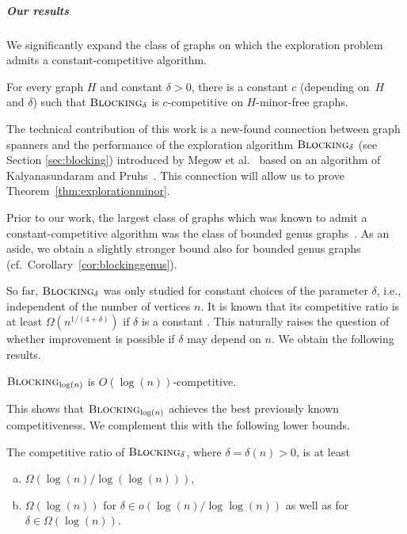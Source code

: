 \documentclass[a4paper,cleveref, autoref, thm-restate, thm-restate, UKenglish]{lipics-v2021}
\newcommand{\blocking}{\textsc{Blocking}}
\begin{document}
\subparagraph*{Our results} 

We significantly expand the class of graphs on which the exploration problem admits a constant-competitive algorithm.


\begin{theorem}\label{thm:explorationminor}
For every graph $H$ and constant $\delta>0$, there is a constant $c$ (depending on~$H$ and $\delta$) such that $\blocking_\delta$ is $c$-competitive on $H$-minor-free graphs.
\end{theorem}

The technical contribution of this work is a new-found connection between graph spanners and the performance of the exploration algorithm $\blocking_\delta$ (see Section \ref{sec:blocking}) introduced by Megow et al.~\cite{megow} based on an algorithm of Kalyanasundaram and Pruhs~\cite{pruhs94}. This connection will allow us to prove Theorem~\ref{thm:explorationminor}.

Prior to our work, the largest class of graphs which was known to admit a constant-competitive algorithm was the class of bounded genus graphs~\cite{megow}. 
As an aside, we obtain a slightly stronger bound also for bounded genus graphs (cf.~Corollary~\ref{cor:blockinggenus}).

So far, $\blocking_\delta$ was only studied for constant choices of the parameter $\delta$, i.e., independent of the number of vertices $n$. It is known that its competitive ratio is at least $\Omega (n^{1/(4+\delta )})$ if $\delta$ is a constant \cite{megow}. This naturally raises the question of whether improvement is possible if $\delta$ may depend on $n$. We obtain the following results. 

\begin{theorem}\label{thm:explorationlogn}
$\blocking_{\log (n)}$ is $O(\log(n))$-competitive.
\end{theorem}

This shows that $\blocking_{\log (n)}$ achieves the best previously known competitiveness. We complement this with the following lower bounds.

\begin{theorem}\label{thm:blockinglower}
The competitive ratio of $\blocking_\delta$, where $\delta=\delta(n)>0$, is at least
\begin{enumerate}[a)]
\item $\Omega(\log (n)/ \log (\log (n)))$,\label{thmpart:general:lowerbound}
\item $\Omega(\log (n))$ for $\delta \in o(\log (n)/ \log \log (n))$ as well as for~$\delta \in \Omega(\log (n))$.\label{thmpart:specific:delta:lowerbound}
\end{enumerate}
\end{theorem}
\end{document}
